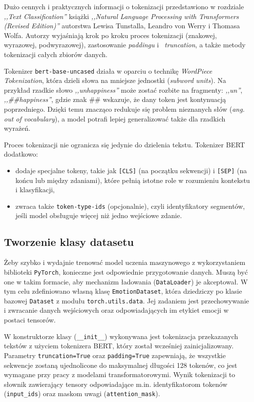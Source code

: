 \documentclass[wmii, inf, mgr]{uwmthesis}
\begin{document}
Dużo cennych i praktycznych informacji o tokenizacji przedstawiono w rozdziale \textit{,,Text Classification''} książki \textit{,,Natural Language Processing with Transformers (Revised Edition)''} \cite{NaturalLanguageProcessing} autorstwa Lewisa Tunstalla, Leandro von Werry i Thomasa Wolfa. Autorzy wyjaśniają krok po kroku proces tokenizacji (znakowej, wyrazowej, podwyrazowej), zastosowanie \textit{paddingu} i~ \textit{truncation}, a także metody tokenizacji całych zbiorów danych.

Tokenizer \texttt{bert-base-uncased} działa w oparciu o technikę \textit{WordPiece Tokenization}, która dzieli słowa na mniejsze jednostki (\textit{subword units}). Na przykład rzadkie słowo \textit{,,unhappiness''} może zostać rozbite na fragmenty: \textit{,,un''}, \textit{,,\#\#happiness''}, gdzie znak \#\# wskazuje, że dany token jest kontynuacją poprzedniego. Dzięki temu znacząco redukuje się problem nieznanych słów (\textit{ang. out of vocabulary}), a model potrafi lepiej generalizować także dla rzadkich wyrażeń.

Proces tokenizacji nie ogranicza się jedynie do dzielenia tekstu. Tokenizer BERT dodatkowo:
\begin{itemize}
    \item dodaje specjalne tokeny, takie jak \texttt{[CLS]} (na początku sekwencji) i \texttt{[SEP]} (na końcu lub między zdaniami), które pełnią istotne role w rozumieniu kontekstu i klasyfikacji,
    \item zwraca także \texttt{token-type-ids} (opcjonalnie), czyli identyfikatory segmentów, jeśli model obsługuje więcej niż jedno wejściowe zdanie.
\end{itemize}


\subsection{Tworzenie klasy datasetu}
Żeby szybko i wydajnie trenować model uczenia maszynowego z wykorzystaniem biblioteki \texttt{PyTorch}, konieczne jest odpowiednie przygotowanie danych. Muszą być one w takim formacie, aby mechanizm ładowania (\texttt{DataLoader}) je akceptował. W tym celu zdefiniowano własną klasę \texttt{EmotionDataset}, która dziedziczy po klasie bazowej \texttt{Dataset} z modułu \texttt{torch.utils.data}. Jej zadaniem jest przechowywanie i zwracanie danych wejściowych oraz odpowiadających im etykiet emocji w postaci tensorów.

W konstruktorze klasy (\texttt{\_\_init\_\_}) wykonywana jest tokenizacja przekazanych tekstów z użyciem tokenizera BERT, który został wcześniej zainicjalizowany. Parametry \texttt{truncation=True} oraz \texttt{padding=True} zapewniają, że wszystkie sekwencje zostaną ujednolicone do maksymalnej długości 128 tokenów, co jest wymagane przy pracy z modelami transformatorowymi. Wynik tokenizacji to słownik zawierający tensory odpowiadające m.in. identyfikatorom tokenów (\texttt{input\_ids}) oraz maskom uwagi (\texttt{attention\_mask}).
\end{document}
